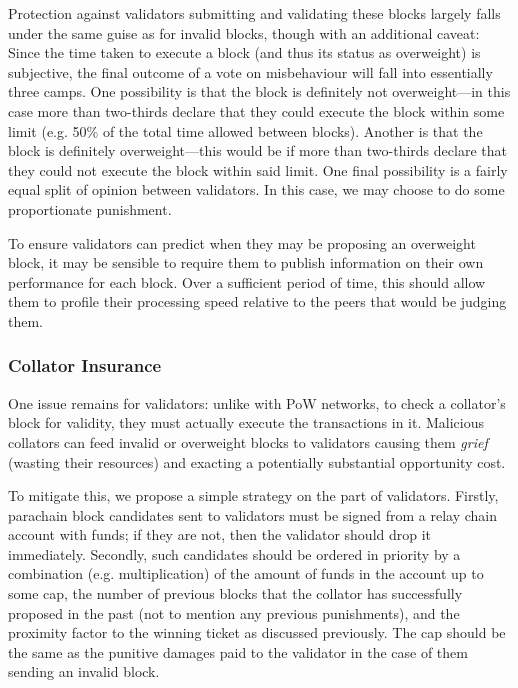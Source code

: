\documentclass[9pt,oneside]{amsart}
\makeatletter
\newcommand*\eg{e.g.\@\xspace}
\makeatother
\begin{document}
\begin{multicols}{2}
Protection against validators submitting and validating these blocks largely falls under the same guise as for invalid blocks, though with an additional caveat: Since the time taken to execute a block (and thus its status as overweight) is subjective, the final outcome of a vote on misbehaviour will fall into essentially three camps. One possibility is that the block is definitely not overweight---in this case more than two-thirds declare that they could execute the block within some limit (\eg 50\% of the total time allowed between blocks). Another is that the block is definitely overweight---this would be if more than two-thirds declare that they could not execute the block within said limit. One final possibility is a fairly equal split of opinion between validators. In this case, we may choose to do some proportionate punishment.

To ensure validators can predict when they may be proposing an overweight block, it may be sensible to require them to publish information on their own performance for each block. Over a sufficient period of time, this should allow them to profile their processing speed relative to the peers that would be judging them.

\subsubsection{Collator Insurance}

 One issue remains for validators: unlike with PoW networks, to check a collator's block for validity, they must actually execute the transactions in it. Malicious collators
can feed invalid or overweight blocks to validators causing them \textit{grief} (wasting their resources) and exacting a potentially substantial opportunity cost.

 To mitigate this, we propose a simple strategy on the part of validators. Firstly, parachain block candidates sent to validators must be signed from a relay chain account with funds; if they are not, then the validator should drop it immediately. Secondly, such candidates should be ordered in priority by a combination (\eg multiplication) of the amount of funds in the account up to some cap, the number of previous blocks that the collator has successfully proposed in the past (not to mention any previous punishments), and the proximity factor to the winning ticket as discussed previously. The cap should be the same as the punitive damages paid to the validator in the case of them sending an invalid block.


\end{multicols}
\end{document}
